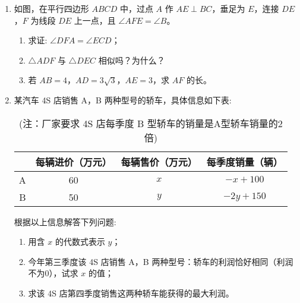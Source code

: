 \documentclass{ExamJHSMath}
\begin{document}
\begin{enumerate}[resume,ref={\arabic*}]
  \item {} 如图，在平行四边形 $ABCD$ 中，过点 $A$ 作 $AE\perp BC$，垂足为 $E$，连接 $DE$，$F$ 为线段 $DE$ 上一点，且 $\angle AFE=\angle B$。
  \begin{enumerate}
    \item 求证: $\angle DFA=\angle ECD$；
    \item $\triangle ADF$ 与 $\triangle DEC$ 相似吗？为什么？
    \newpage
    \item 若 $AB= 4$，$AD= 3\sqrt{3}$，$AE=3$，求 $AF$ 的长。
  \end{enumerate}
  \vspace{15ex}
  
  \item {} 某汽车 4S 店销售 A，B 两种型号的轿车，具体信息如下表:
  \begin{table}[htbp] \centering
    \renewcommand\arraystretch{1.2}{
      \begin{tabular}{|c|c|c|c|}
      \hline
      & 每辆进价（万元） & 每辆售价（万元） & 每季度销量（辆） \\ \hline
        A & 60 & $x$ & $-x+100$ \\ \hline
        B & 50 & $y$ & $-2y+150$ \\ \hline
      \end{tabular}
    }
    \caption*{(注：厂家要求 4S 店每季度 B 型轿车的销量是A型轿车销量的2倍)}
  \end{table}
  \vspace{-2ex}
  根据以上信息解答下列问题:
  \begin{enumerate}
    \item 用含 $x$ 的代数式表示 $y$；
    \item 今年第三季度该 4S 店销售 A，B 两种型号：轿车的利润恰好相同（利润不为0），试求 $x$ 的值；
    \item 求该 4S 店第四季度销售这两种轿车能获得的最大利润。
  \end{enumerate}
  \vspace{20ex}


\end{enumerate}
\end{document}
